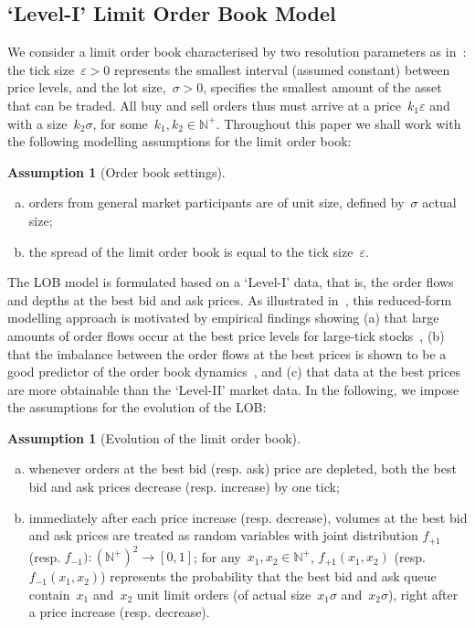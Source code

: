 \documentclass{amsart}[11pt]
\numberwithin{equation}{section}
\theoremstyle{definition}
\newtheorem{assumption}[theorem]{Assumption}
\newcommand{\NN}{\mathbb{N}}
\newcommand{\eps}{\varepsilon}
\begin{document}
\subsection{`Level-I' Limit Order Book Model}\label{subsec:LOB basic assumption}
We consider a limit order book characterised by two resolution parameters as in~\cite[Section~2.1]{gould2013limit}: 
the tick size~$\eps>0$ represents the smallest interval (assumed constant) between price levels,
and the lot size,~$\sigma >0$, specifies the smallest amount of the asset that can be traded.
All buy and sell orders thus must arrive at a price~$k_1\eps$
and with a size~$k_2\sigma$, for some~$k_1, k_2\in\NN^+$.
Throughout this paper we shall work with the following modelling assumptions for the limit order book:
\begin{assumption}[Order book settings]\label{ass:Underlying}\ 
\begin{enumerate}[(a)]
\item \label{ass:Underlying1} 
orders from general market participants are of unit size, 
defined by~$\sigma$ actual size;
\item \label{ass:Underlying2} the spread of the limit order book is equal to the tick size~$\eps$.
\end{enumerate}
\end{assumption}
The LOB model is formulated based on a `Level-I' data, that is, the order flows and depths at the best bid and ask prices. 
As illustrated in~\cite[Section~2.1]{cont2013price},
this reduced-form modelling approach is motivated by empirical findings 
showing (a) that large amounts of order flows occur at the best price levels for large-tick stocks~\cite{gareche2013fokker},
(b) that the imbalance between the order flows at the best prices is shown to be a good predictor of the order book dynamics~\cite{cartea2015enhancing, cont2014price},
and (c) that data at the best prices are more obtainable than the `Level-II' market data.
In the following, we impose the assumptions for the evolution of the LOB:
\begin{assumption}[Evolution of the limit order book]\label{ass:LOBEvolution}\leavevmode
\begin{enumerate}[(a)]
\item \label{ass:LOBEvolution1} 
whenever orders at the best bid (resp. ask) price are depleted, 
both the best bid and ask prices decrease (resp. increase) by one tick;
\item \label{ass:LOBEvolution3} 
immediately after each price increase (resp. decrease), volumes at the best bid and ask prices are treated as random variables with joint distribution
$f_{+1}$  (resp. $f_{-1}): (\NN^+)^2\to[0, 1]$;
for any~$x_1, x_2\in\NN^+$, $f_{+1}(x_1 ,x_2)$ (resp. $f_{-1}(x_1, x_2)$) 
represents the probability that the best bid and ask queue contain~$x_1$ and~$x_2$ unit limit orders
(of actual size~$x_1\sigma$ and~$x_2\sigma$), 
right after a price increase (resp. decrease).
\end{enumerate}
\end{assumption}
\end{document}
